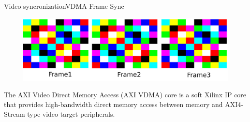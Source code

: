 \begin{frame}{Video syncronization}{VDMA Frame Sync}
	\begin{figure}
		\centering
		\includegraphics[scale=0.6]{graphics/vdma.jpeg}
	\end{figure}
	\begin{block}{}
		The AXI Video Direct Memory Access (AXI VDMA) core is a soft Xilinx IP core that provides high-bandwidth direct memory access between memory and AXI4-Stream type video target peripherals.
	\end{block}
\end{frame}
